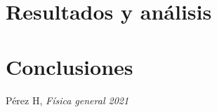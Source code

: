 \documentclass{article}
\begin{document}
\begin{multicols}{2}
\section*{Resultados y análisis}\label{Resultados}			%


\section*{Conclusiones}\label{Conclusiones}				%


\begin{thebibliography}{9}						%

%
	Pérez H, \emph{Física general 2021}
\end{thebibliography}


\end{multicols}
\end{document}
